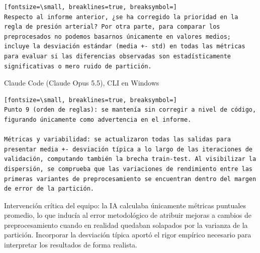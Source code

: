 \documentclass[12pt,a4paper,oneside]{book}
\begin{document}
\begin{iaprompt}
\begin{Verbatim}[fontsize=\small, breaklines=true, breaksymbol=]
Respecto al informe anterior, ¿se ha corregido la prioridad en la regla de presión arterial? Por otra parte, para comparar los preprocesados no podemos basarnos únicamente en valores medios; incluye la desviación estándar (media +- std) en todas las métricas para evaluar si las diferencias observadas son estadísticamente significativas o mero ruido de partición.
\end{Verbatim}
\end{iaprompt}
\begin{iaresp}{Claude Code (Claude Opus 5.5), CLI en Windows}
\begin{Verbatim}[fontsize=\small, breaklines=true, breaksymbol=]
Punto 9 (orden de reglas): se mantenía sin corregir a nivel de código, figurando únicamente como advertencia en el informe.

Métricas y variabilidad: se actualizaron todas las salidas para presentar media +- desviación típica a lo largo de las iteraciones de validación, computando también la brecha train-test. Al visibilizar la dispersión, se comprueba que las variaciones de rendimiento entre las primeras variantes de preprocesamiento se encuentran dentro del margen de error de la partición.
\end{Verbatim}
\end{iaresp}
\begin{iaanalisis}
Intervención crítica del equipo: la IA calculaba únicamente métricas puntuales promedio, lo que inducía al error metodológico de atribuir mejoras a cambios de preprocesamiento cuando en realidad quedaban solapados por la varianza de la partición. Incorporar la desviación típica aportó el rigor empírico necesario para interpretar los resultados de forma realista.
\end{iaanalisis}
\end{document}
